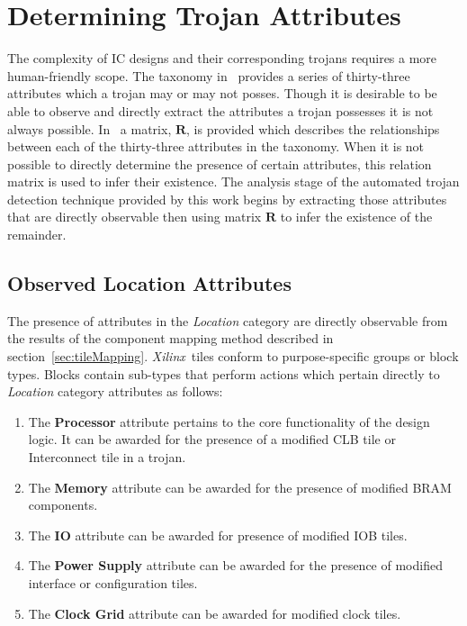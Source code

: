 \documentclass[conference]{IEEEtran}
\newcommand{\Xilinx}{\textit{\gls{Xilinx}}~}
\begin{document}
\section{Determining Trojan Attributes} \label{sec:trojanAttributes}
The complexity of \acrlong{IC} designs and their corresponding trojans requires a more human-friendly scope.
The taxonomy in~\cite{samerAttribute} provides a series of thirty-three attributes which a trojan may or may not posses.
Though it is desirable to be able to observe and directly extract the attributes a trojan possesses it is not always possible. 
In~\cite{samerAttribute} a matrix, $\mathbf{R}$, is provided which describes the relationships between each of the thirty-three attributes in the taxonomy.
When it is not possible to directly determine the presence of certain attributes, this relation matrix is used to infer their existence.
The analysis stage of the automated trojan detection technique provided by this work begins by extracting those attributes that are directly observable then using matrix $\mathbf{R}$ to infer the existence of the remainder. 

\subsection{Observed Location Attributes}
The presence of attributes in the \textit{Location} category are directly observable from the results of the component mapping method described in section~\ref{sec:tileMapping}.
\Xilinx tiles conform to purpose-specific groups or block types.
Blocks contain sub-types that perform actions which pertain directly to \textit{Location} category attributes as follows: 
\begin{enumerate}
	\item The \textbf{Processor} attribute pertains to the core functionality of the design logic. It can be awarded for the presence of a modified \acrshort{CLB} tile or Interconnect tile in a trojan.
	\item The \textbf{Memory} attribute can be awarded for the presence of modified \acrshort{BRAM} components.
	\item The \textbf{\acrshort{IO}} attribute can be awarded for presence of modified \acrshort{IOB} tiles.
	\item The \textbf{Power Supply} attribute can be awarded for the presence of modified interface or configuration tiles.
	\item The \textbf{Clock Grid} attribute can be awarded for modified clock tiles.
\end{enumerate}
\end{document}
